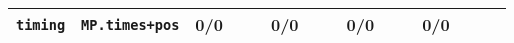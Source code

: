 \begin{tabular}{l l  | r r l | r r l | r r l | r r l l}
         \verb|timing| &                                         \verb|MP.times+pos| &            0/0 &                       &                   &            0/0 &                       &  &            0/0 &                       &                   &            0/0 &                       &                    & \\ \hline 
\end{tabular}
